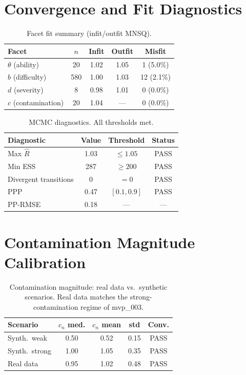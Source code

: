 \documentclass[11pt,twocolumn]{article}
\begin{document}
\section{Convergence and Fit Diagnostics}
\label{sec:diagnostics}

\begin{table}[h]
\centering
\small
\caption{Facet fit summary (infit/outfit MNSQ).}
\label{tab:fit}
\begin{tabular}{@{}lcccc@{}}
\toprule
Facet & $n$ & Infit & Outfit & Misfit \\
\midrule
$\theta$ (ability)    & 20  & 1.02 & 1.05 & 1 (5.0\%) \\
$b$ (difficulty)      & 580 & 1.00 & 1.03 & 12 (2.1\%) \\
$d$ (severity)        & 8   & 0.98 & 1.01 & 0 (0.0\%) \\
$c$ (contamination)   & 20  & 1.04 & ---  & 0 (0.0\%) \\
\bottomrule
\end{tabular}
\end{table}

\begin{table}[h]
\centering
\small
\caption{MCMC diagnostics. All thresholds met.}
\label{tab:mcmc}
\begin{tabular}{@{}lccc@{}}
\toprule
Diagnostic & Value & Threshold & Status \\
\midrule
Max $\hat{R}$        & 1.03 & $\leq 1.05$ & PASS \\
Min ESS              & 287  & $\geq 200$   & PASS \\
Divergent transitions & 0    & $= 0$        & PASS \\
PPP                   & 0.47 & $[0.1, 0.9]$ & PASS \\
PP-RMSE              & 0.18 & ---           & ---  \\
\bottomrule
\end{tabular}
\end{table}

\section{Contamination Magnitude Calibration}

\begin{table}[h]
\centering
\small
\caption{Contamination magnitude: real data vs.\ synthetic scenarios. Real data matches the strong-contamination regime of mvp\_003.}
\label{tab:contam_mag}
\begin{tabular}{@{}lcccc@{}}
\toprule
Scenario & $c_n$ med. & $c_n$ mean & std & Conv. \\
\midrule
Synth.\ weak    & 0.50 & 0.52 & 0.15 & PASS \\
Synth.\ strong  & 1.00 & 1.05 & 0.35 & PASS \\
Real data       & 0.95 & 1.02 & 0.48 & PASS \\
\bottomrule
\end{tabular}
\end{table}
\end{document}

